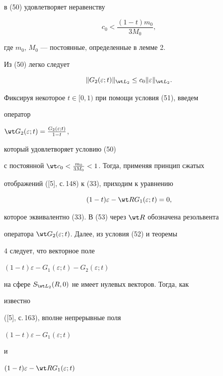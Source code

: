 в (50) удовлетворяет неравенству 


\begin{equation} 


c_0<\frac{(1-t)m_0}{3M_0}, 


\end{equation} 


где $m_0$, $M_0$ --- постоянные, определенные в лемме 2. 


 


Из (50) легко следует 


\begin{equation} 


\|G_2(\varepsilon;t)\|_{\wt L_2}\le c_0\|\varepsilon\|_{\wt L_2}. 


\end{equation} 


Фиксируя некоторое $t\in[0,1)$ при помощи условия (51), введем 


оператор 


$\wt G_2(\varepsilon;t)= 


\frac{G_2(\varepsilon;t)}{1-t}$,


который удовлетворяет условию (50) 


с постоянной $\wt c_0<\frac{m_0}{3M_0}<1$. Тогда, применяя принцип сжатых 


отображений ([5], с.\,148) к (33), приходим к уравнению 


\begin{equation} 


(1-t)\varepsilon-\wt R G_1(\varepsilon;t)=0, 


\end{equation} 


которое эквивалентно (33). В (53) через $\wt R$ обозначена резольвента 


оператора $\wt G_2(\varepsilon;t)$. Далее, из условия (52) и теоремы 


4 следует, что векторное поле 


$(1-t)\varepsilon-G_1(\varepsilon;t)-G_2(\varepsilon;t)$ 


на сфере $S_{\wt L_2}(R,0)$ не имеет нулевых векторов. Тогда, как 


известно 


([5], с.\,163), вполне непрерывные поля 


$(1-t)\varepsilon-G_1(\varepsilon;t)$ 


и 


$(1-t)\varepsilon-\wt R G_1(\varepsilon;t)$ 


